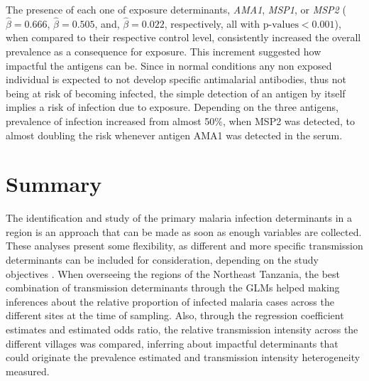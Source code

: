The presence of each one of exposure determinants, \textit{AMA1}, \textit{MSP1}, or \textit{MSP2} ($\hat{\beta}=0.666$, $\hat{\beta}=0.505$, and, $\hat{\beta}=0.022$, respectively, all with $\text{p-values}<0.001$), when compared to their respective control level, consistently increased the overall prevalence as a consequence for exposure.
This increment suggested how impactful the antigens can be.
Since in normal conditions any non exposed individual is expected to not develop specific antimalarial antibodies, thus not being at risk of becoming infected, the simple detection of an antigen by itself implies a risk of infection due to exposure.
Depending on the three antigens, prevalence of infection increased from almost 50\%, when MSP2 was detected, to almost doubling the risk whenever antigen AMA1 was detected in the serum.


\section{Summary}

The identification and study of the primary malaria infection determinants in a region is an approach that can be made as soon as enough variables are collected.
These analyses present some flexibility, as different and more specific transmission determinants can be included for consideration, depending on the study objectives \cite{binka1995risk}.
When overseeing the regions of the Northeast Tanzania, the best combination of transmission determinants through the GLMs helped making inferences about the relative proportion of infected malaria cases across the different sites at the time of sampling.
Also, through the regression coefficient estimates and estimated odds ratio, the relative transmission intensity across the different villages was compared, inferring about impactful determinants that could originate the prevalence estimated and transmission intensity heterogeneity measured.

